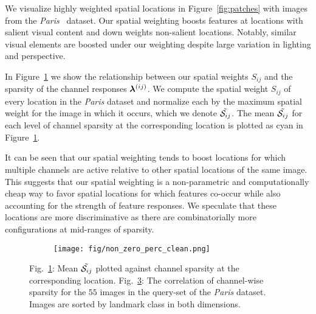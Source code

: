 \documentclass[runningheads]{llncs}
\begin{document}
We visualize highly weighted spatial locations in Figure~\ref{fig:patches} with images from the \emph{Paris}~\cite{PCS+08} dataset. Our spatial weighting boosts features at locations with salient visual content and down weights non-salient locations. Notably, similar visual elements are boosted under our weighting despite large variation in lighting and perspective.

In Figure~\ref{fig:sparsity2} we show the relationship between our spatial weights $S_{ij}$ and the sparsity of the channel responses $\bm{\lambda}^{(ij)}$. We compute the spatial weight $S_{ij}$ of every location in the \emph{Paris} dataset and normalize each by the maximum spatial weight for the image in which it occurs, which we denote $\tilde{\mathcal{S}_{ij}}$. The mean $\tilde{\mathcal{S}_{ij}}$ for each level of channel sparsity at the corresponding location is plotted as cyan in Figure~\ref{fig:sparsity2}. 







It can be seen that our spatial weighting tends to boost locations for which multiple channels are active relative to other spatial locations of the same image. This suggests that our spatial weighting is a non-parametric and computationally cheap way to favor spatial locations for which features co-occur while also accounting for the strength of feature responses. We speculate that these locations are more discriminative as there are combinatorially more configurations at mid-ranges of sparsity.


\begin{figure}[t]
\begin{subfigure}{0.56\textwidth}
\caption{}
\label{fig:sparsity2}
\end{subfigure}
\begin{subfigure}{0.43\textwidth}
\centering
\vspace{-.79cm}
\texttt{[image: fig/non\_zero\_perc\_clean.png]}
\caption{}
\label{fig:sparsity_correlation}
\end{subfigure}
\caption{Fig.~\ref{fig:sparsity2}: Mean $\tilde{\mathcal{S}_{ij}}$ plotted against channel sparsity at the corresponding location. Fig.~\ref{fig:sparsity_correlation}: The correlation of channel-wise sparsity for the $55$ images in the query-set of the \emph{Paris} dataset. Images are sorted by landmark class in both dimensions.}


\end{figure}
\end{document}

